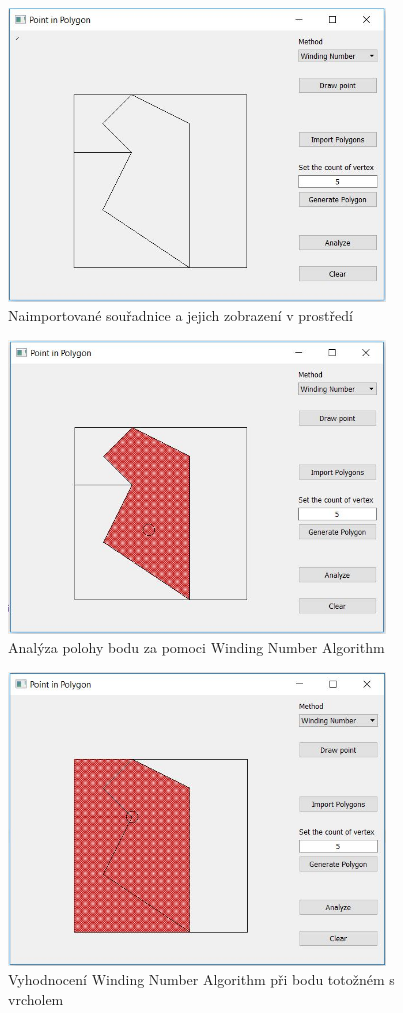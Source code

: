 \documentclass[a4paper, 12pt]{article}
\begin{document}
\begin{figure}[h!]
	\centering
	\includegraphics[width=10cm]{import.jpg}
	\caption{Naimportované souřadnice a jejich zobrazení v prostředí}
\end{figure}

\begin{figure}[h!]
	\centering
	\includegraphics[width=10cm]{analyze_inside.jpg}
	\caption{Analýza polohy bodu za pomoci Winding Number Algorithm}
\end{figure}

\begin{figure}[h!]
	\centering
	\includegraphics[width=10cm]{winding_vertex.jpg}
	\caption{Vyhodnocení Winding Number Algorithm při bodu totožném s vrcholem}
\end{figure}
\end{document}
